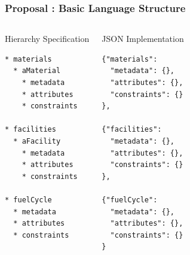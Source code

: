 \begin{frame}[fragile]
  \frametitle{Proposal : Basic Language Structure}
  \begin{columns}[t]
    \begin{block}{Hierarchy Specification}\begin{small}\begin{verbatim}
* materials
  * aMaterial
    * metadata
    * attributes
    * constraints
      
* facilities
  * aFacility
    * metadata
    * attributes
    * constraints
      
* fuelCycle
  * metadata
  * attributes
  * constraints
    \end{verbatim}\end{small}\end{block}
    \begin{block}{JSON Implementation}\begin{small}\begin{verbatim}
{"materials":     
  "metadata": {},
  "attributes": {},
  "constraints": {}
},
      
{"facilities":     
  "metadata": {},
  "attributes": {},
  "constraints": {}
},

{"fuelCycle":     
  "metadata": {},
  "attributes": {},
  "constraints": {}
}
      \end{verbatim}\end{small}\end{block}
  \end{columns}
\end{frame}

